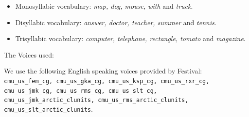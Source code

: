 \documentclass{book}
\begin{document}
\begin{appendices}
\begin{itemize}
	\item Monosyllabic vocabulary: \textit{map, dog, mouse, with} and \textit{truck}.
	\item Disyllabic vocabulary: \textit{answer, doctor, teacher, summer}  and \textit{tennis}.
	\item Trisyllabic vocabulary: \textit{computer, telephone, rectangle, tomato} and \textit{magazine}.
\end{itemize}

The Voices used:

We use the following English speaking voices provided by Festival: \texttt{cmu\_us\_fem\_cg, cmu\_us\_gka\_cg, cmu\_us\_ksp\_cg, cmu\_us\_rxr\_cg, cmu\_us\_jmk\_cg, cmu\_us\_rms\_cg, cmu\_us\_slt\_cg, cmu\_us\_jmk\_arctic\_clunits, cmu\_us\_rms\_arctic\_clunits, cmu\_us\_slt\_arctic\_clunits}.





\end{appendices}
\end{document}
